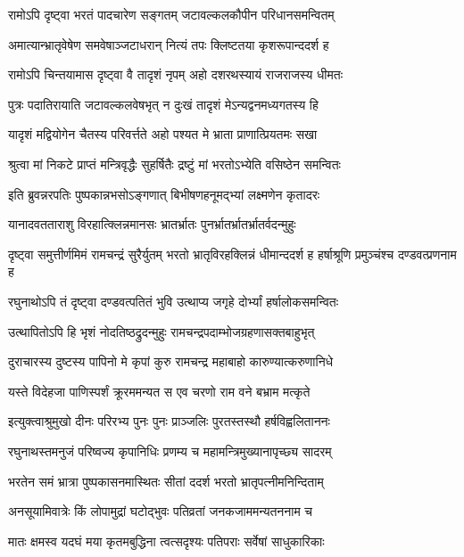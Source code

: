\twolineshloka
{रामोऽपि दृष्ट्वा भरतं पादचारेण सङ्गतम्}
{जटावल्कलकौपीन परिधानसमन्वितम्}%

\twolineshloka
{अमात्यान्भ्रातृवेषेण समवेषाञ्जटाधरान्}
{नित्यं तपः क्लिष्टतया कृशरूपान्ददर्श ह}%

\twolineshloka
{रामोऽपि चिन्तयामास दृष्ट्वा वै तादृशं नृपम्}
{अहो दशरथस्यायं राजराजस्य धीमतः}%

\twolineshloka
{पुत्रः पदातिरायाति जटावल्कलवेषभृत्}
{न दुःखं तादृशं मेऽन्यद्वनमध्यगतस्य हि}%

\twolineshloka
{यादृशं मद्वियोगेन चैतस्य परिवर्त्तते}
{अहो पश्यत मे भ्राता प्राणात्प्रियतमः सखा}%

\twolineshloka
{श्रुत्वा मां निकटे प्राप्तं मन्त्रिवृद्धैः सुहर्षितैः}
{द्रष्टुं मां भरतोऽभ्येति वसिष्ठेन समन्वितः}%

\twolineshloka
{इति ब्रुवन्नरपतिः पुष्पकान्नभसोऽङ्गणात्}
{बिभीषणहनूमद्भ्यां लक्ष्मणेन कृतादरः}%

\twolineshloka
{यानादवतताराशु विरहात्क्लिन्नमानसः}
{भ्रातर्भ्रातः पुनर्भ्रातर्भ्रातर्भ्रातर्वदन्मुहुः}%

\threelineshloka
{दृष्ट्वा समुत्तीर्णमिमं रामचन्द्रं सुरैर्युतम्}
{भरतो भ्रातृविरहक्लिन्नं धीमान्ददर्श ह}
{हर्षाश्रूणि प्रमुञ्चंश्च दण्डवत्प्रणनाम ह}%

\twolineshloka
{रघुनाथोऽपि तं दृष्ट्वा दण्डवत्पतितं भुवि}
{उत्थाप्य जगृहे दोर्भ्यां हर्षालोकसमन्वितः}%

\twolineshloka
{उत्थापितोऽपि हि भृशं नोदतिष्ठद्रुदन्मुहुः}
{रामचन्द्रपदाम्भोजग्रहणासक्तबाहुभृत्}%


\twolineshloka
{दुराचारस्य दुष्टस्य पापिनो मे कृपां कुरु}
{रामचन्द्र महाबाहो कारुण्यात्करुणानिधे}%

\twolineshloka
{यस्ते विदेहजा पाणिस्पर्शं क्रूरममन्यत}
{स एव चरणो राम वने बभ्राम मत्कृते}%

\twolineshloka
{इत्युक्त्वाश्रुमुखो दीनः परिरभ्य पुनः पुनः}
{प्राञ्जलिः पुरतस्तस्थौ हर्षविह्वलिताननः}%

\twolineshloka
{रघुनाथस्तमनुजं परिष्वज्य कृपानिधिः}
{प्रणम्य च महामन्त्रिमुख्यानापृच्छ्य सादरम्}%

\twolineshloka
{भरतेन समं भ्रात्रा पुष्पकासनमास्थितः}
{सीतां ददर्श भरतो भ्रातृपत्नीमनिन्दिताम्}%

\twolineshloka
{अनसूयामिवात्रेः किं लोपामुद्रां घटोद्भुवः}
{पतिव्रतां जनकजाममन्यतननाम च}%

\twolineshloka
{मातः क्षमस्व यदघं मया कृतमबुद्धिना}
{त्वत्सदृश्यः पतिपराः सर्वेषां साधुकारिकाः}%

